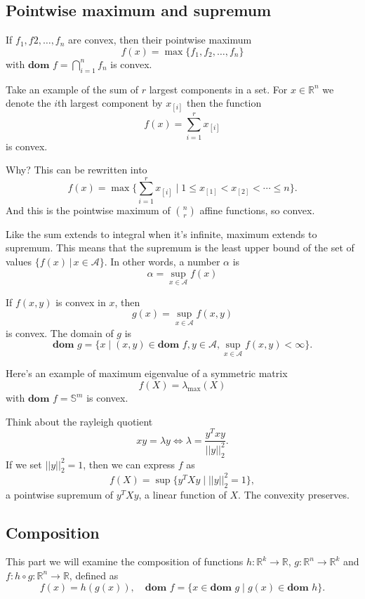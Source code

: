 \documentclass[lang=en,color=blue,mode=fancy,titlestyle=hang]{elegantbook}
\begin{document}
\subsection{Pointwise maximum and supremum}

If $f_1, f2, \ldots, f_n$ are convex, then their pointwise maximum
\[
f(x) = \max\{f_1, f_2, \ldots, f_n\}
\]
with $\textbf{dom } f = \bigcap_{i = 1}^n f_n$ is convex.

Take an example of the sum of $r$ largest components in a set. For $x \in \mathbb{R}^n$
we denote the $i$th largest component by $x_{[i]}$ then the function
\[
f(x) = \sum_{i = 1}^r x_{[i]}
\]
is convex.

Why? This can be rewritten into
\[
f(x) = \max\{\sum_{i = 1}^r x_{[i]} \;|\; 1 \leq x_{[1]} < x_{[2]} < \cdots \leq n\}.
\]
And this is the pointwise maximum of $\binom{n}{r}$ affine functions, so convex.

Like the sum extends to integral when it's infinite, maximum extends to supremum.
This means that the supremum is the least upper bound of the set of values
$\{f(x)\,|\,x\in\mathcal{A}\}$. In other words, a number $\alpha$ is
\[
\alpha=\sup_{x\in\mathcal{A}} f(x)
\]

If $f(x, y)$ is convex in $x$, then
\[
g(x) = \sup_{x\in\mathcal{A}} f(x, y)
\]
is convex. The domain of $g$ is
\[
\textbf{dom } g = \{ x \;|\; (x, y) \in \textbf{dom } f, y \in \mathcal{A}, \sup_{x\in\mathcal{A}} f(x, y) < \infty \}.
\]

Here's an example of maximum eigenvalue of a symmetric matrix
\[
f(X) = \lambda_{\max}(X)
\]
with $\textbf{dom } f = \mathbb{S}^m$ is convex.

Think about the rayleigh quotient
\[
x y = \lambda y \Leftrightarrow \lambda = \frac{y^T x y}{||y||_2^2}.
\]
If we set $||y||_2^2 = 1$, then we can express $f$ as
\[
f(X) = \sup\{y^T X y \;|\; ||y||_2^2 = 1\},
\]
a pointwise supremum of $y^T X y$, a linear function of $X$. The convexity preserves.

\subsection{Composition}

This part we will examine the composition of functions $h: \mathbb{R}^k \rightarrow \mathbb{R}$,
$g: \mathbb{R}^n \rightarrow \mathbb{R}^k$ and $f: h \circ g: \mathbb{R}^n \rightarrow \mathbb{R}$,
defined as
\[
f(x) = h(g(x)), \quad \textbf{dom } f = \{x \in \textbf{dom } g \;|\; g(x) \in \textbf{dom } h\}.
\]
\end{document}
